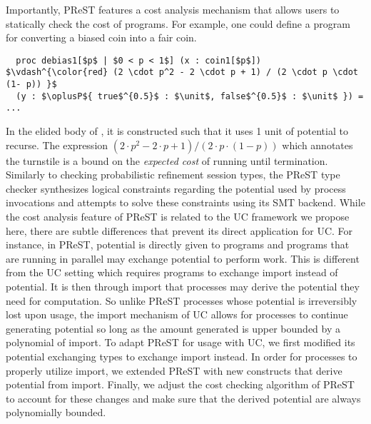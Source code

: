 Importantly, PReST features a cost analysis mechanism that allows users to
statically check the cost of programs. For example, one could define a 
 program for converting a biased coin into a fair coin.
\begin{lstlisting}
  proc debias1[$p$ | $0 < p < 1$] (x : coin1[$p$])
$\vdash^{\color{red} (2 \cdot p^2 - 2 \cdot p + 1) / (2 \cdot p \cdot (1- p)) }$ 
  (y : $\oplusP${ true$^{0.5}$ : $\unit$, false$^{0.5}$ : $\unit$ }) = ...
\end{lstlisting}
In the elided body of , it is constructed such that it uses 1 unit 
of potential to recurse. The expression $(2 \cdot p^2 - 2 \cdot p + 1) / (2 \cdot p \cdot (1- p))$
which annotates the turnstile is a bound on the \emph{expected cost} of running
 until termination. Similarly to checking probabilistic refinement 
session types, the PReST type checker synthesizes logical constraints regarding
the potential used by process invocations and attempts to solve these
constraints using its SMT backend. While the cost analysis feature of PReST is
related to the UC framework we propose here, there are subtle differences that
prevent its direct application for UC. For instance, in PReST, potential is
directly given to programs and programs that are running in parallel may
exchange potential to perform work. This is different from the UC setting which
requires programs to exchange import instead of potential. It is then through
import that processes may derive the potential they need for computation.
So unlike PReST processes whose potential is irreversibly lost upon usage, the
import mechanism of UC allows for processes to continue generating potential so
long as the amount generated is upper bounded by a polynomial of import.
To adapt PReST for usage with UC, we first modified its potential exchanging types to
exchange import instead. In order for processes to properly utilize import, we 
extended PReST with new constructs that derive potential from import. Finally,  
we adjust the cost checking algorithm of PReST to account for these changes and
make sure that the derived potential are always polynomially bounded.
